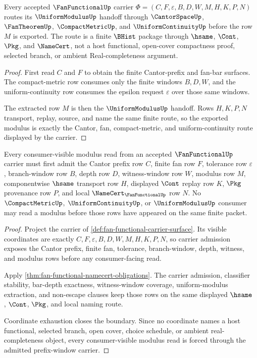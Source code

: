 \begin{theorem}
\label{thm:fan-functional-root-uniform-modulus-handoff}
Every accepted $\FanFunctionalUp$ carrier $\Phi=(C,F,\varepsilon,B,D,W,M,H,K,P,N)$ routes its $\UniformModulusUp$ handoff through $\CantorSpaceUp$, $\FanTheoremUp$, $\CompactMetricUp$, and $\UniformContinuityUp$ before the row $M$ is exported. The route is a finite $\BHist$ package through $\hsame$, $\Cont$, $\Pkg$, and $\NameCert$, not a host functional, open-cover compactness proof, selected branch, or ambient Real-completeness argument.
\end{theorem}
\begin{proof}
First read $C$ and $F$ to obtain the finite Cantor-prefix and fan-bar surfaces. The compact-metric row consumes only the finite windows $B,D,W$, and the uniform-continuity row consumes the epsilon request $\varepsilon$ over those same windows.

The extracted row $M$ is then the $\UniformModulusUp$ handoff. Rows $H,K,P,N$ transport, replay, source, and name the same finite route, so the exported modulus is exactly the Cantor, fan, compact-metric, and uniform-continuity route displayed by the carrier.
\end{proof}

\begin{theorem}
\label{thm:fan-functional-prefix-window-carrier-admission}
Every consumer-visible modulus read from an accepted $\FanFunctionalUp$ carrier must first admit the Cantor prefix row $C$, finite fan row $F$, tolerance row $\varepsilon$, branch-window row $B$, depth row $D$, witness-window row $W$, modulus row $M$, componentwise $\hsame$ transport row $H$, displayed $\Cont$ replay row $K$, $\Pkg$ provenance row $P$, and local $\NameCert_{\FanFunctionalUp}$ row $N$. No $\CompactMetricUp$, $\UniformContinuityUp$, or $\UniformModulusUp$ consumer may read a modulus before those rows have appeared on the same finite packet.
\end{theorem}
\begin{proof}
Project the carrier of \autoref{def:fan-functional-carrier-surface}. Its visible coordinates are exactly $C,F,\varepsilon,B,D,W,M,H,K,P,N$, so carrier admission exposes the Cantor prefix, finite fan, tolerance, branch-window, depth, witness, and modulus rows before any consumer-facing read.

Apply \autoref{thm:fan-functional-namecert-obligations}. The carrier admission, classifier stability, bar-depth exactness, witness-window coverage, uniform-modulus extraction, and non-escape clauses keep those rows on the same displayed $\hsame$, $\Cont$, $\Pkg$, and local naming route.

Coordinate exhaustion closes the boundary. Since no coordinate names a host functional, selected branch, open cover, choice schedule, or ambient real-completeness object, every consumer-visible modulus read is forced through the admitted prefix-window carrier.
\end{proof}

